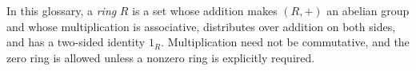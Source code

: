 
In this glossary, a \emph{ring} $R$ is a set whose addition makes $(R,+)$ an abelian group and whose multiplication is associative, distributes over addition on both sides, and has a two-sided identity $1_R$. Multiplication need not be commutative, and the zero ring is allowed unless a nonzero ring is explicitly required.
